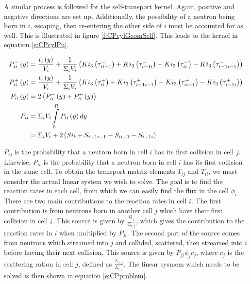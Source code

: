 A similar process is followed for the self-transport kernel.  Again, positive and negative directions are set up.  Additionally, the possibility of a neutron being born in $i$, escaping, then re-entering the other side of $i$ must be accounted for as well.  This is illustrated in figure \ref{f:CPcylGeomSelf}.  This leads to the kernel in equation \ref{e:CPcylPii}.

\begin{subequations}\label{e:CPcylPii}
  \begin{align}
  P_{ii}^-\left(y\right) &= \frac{t_i\left(y\right)}{V_i} + \frac{1}{\Sigma_i V_i}\left(Ki_3\left(\tau_{ii-1}^-\right) + Ki_3\left(\tau_{i-1i}^-\right) - Ki_3\left(\tau_{ii}^-\right) - Ki_3\left(\tau_{i-1i-1}^-\right)\right) \\
  P_{ii}^+\left(y\right) &= \frac{t_i\left(y\right)}{V_i} + \frac{1}{\Sigma_i V_i}\left(Ki_3\left(\tau_{ii}^+\right) + Ki_3\left(\tau_{i-1i-1}^+\right) - Ki_3\left(\tau_{ii-1}^+\right) - Ki_3\left(\tau_{i-1i}^+\right)\right) \\
  P_{ii}\left(y\right) &= 2 \left(P_{ii}^-\left(y\right) + P_{ii}^+\left(y\right)\right) \\
  P_{ii} &= \Sigma_i V_i \intop_0^{R_i} P_{ii}\left(y\right) dy \nonumber \\
  &= \Sigma_i V_i  + 2\left(S{ii} + S_{i-1i-1} - S_{ii-1} - S_{i-1i}\right)
  \end{align}
\end{subequations}

$P_{ij}$ is the probability that a neutron born in cell $i$ has its first collision in cell $j$.  Likewise, $P_{ii}$ is the probability that a neutron born in cell $i$ has its first collision in the same cell.  To obtain the transport matrix elements $T_{ij}$ and $T_{ii}$, we must consider the actual linear system we wish to solve.  The goal is to find the reaction rates in each cell, from which we can easily find the flux in the cell $\phi_i$.  There are two main contributions to the reaction rates in cell $i$.  The first contribution is from neutrons born in another cell $j$ which have their first collision in cell $i$.  This source is given by $\frac{Q_j}{\Sigma_{t,j}}$, which gives the contribution to the reaction rates in $i$ when multiplied by $P_{ji}$.  The second part of the source comes from neutrons which streamed into $j$ and collided, scattered, then streamed into $i$ before having their next collision.  This source is given by $P_{ji} \phi_j c_j$, where $c_j$ is the scattering ration in cell $j$, defined as $\frac{\Sigma_{s,j}}{\Sigma_{t,j}}$.  The linear sysmem which needs to be solved is then shown in equation \ref{e:CPproblem}.

